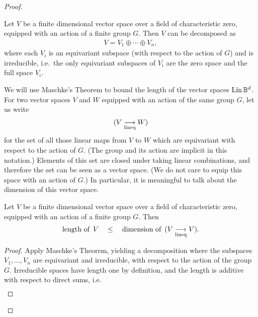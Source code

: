 \begin{proof}
        \begin{fact}
          Let $V$ be a finite dimensional vector space over a field of characteristic zero, equipped with an action of a finite group $G$. Then $V$ can be decomposed as 
            \begin{align*}
            V = V_1 \oplus \cdots \oplus V_n,
            \end{align*}
            where each $V_i$ is an equivariant subspace (with respect to the action of $G$)  and  is  irreducible, i.e.~the only equivariant subspaces of $V_i$ are the zero space  and the full space $V_i$.
        \end{fact}


    We will use Maschke's Theorem to bound the length of the vector  spaces $\operatorname{Lin} \mathbb{B}^d$. 
    For two vector spaces $V$ and $W$ equipped with an action of the same group $G$, let us write 
    \begin{align*}
    ( V  \underset{\textup{lineq}}{\longrightarrow} W)
    \end{align*}
    for the set of all those linear maps from $V$ to $W$ which are equivariant with respect to the action of $G$. (The group and its action are  implicit in this notation.) Elements of this set are closed under taking linear combinations, and therefore the set can be seen as a vector space. (We do not care to equip this space with an action of $G$.) In particular, it is meaningful to talk about the dimension of this vector space. 
    \begin{lemma}\label{lem:dim-bounds-length}
        Let $V$ be a finite dimensional vector space over a field of characteristic zero, equipped with an action of a finite group $G$. Then 
        \begin{align*}
        \text{length of\, $V$} \quad \leq  \quad \text{dimension of\, }  ( V \underset{\textup{lineq}}{\longrightarrow}  V).
        \end{align*}
    \end{lemma}
    \begin{proof}
        Apply Maschke's Theorem, yielding a decomposition 
        where the subspaces $V_1,\ldots,V_n$ are equivariant and irreducible, with respect to the action of the group $G$. Irreducible spaces have length one by definition, and the length is additive with respect to direct sums, i.e.
        \begin{align*}

\end{align*}
\end{proof}
\end{proof}
